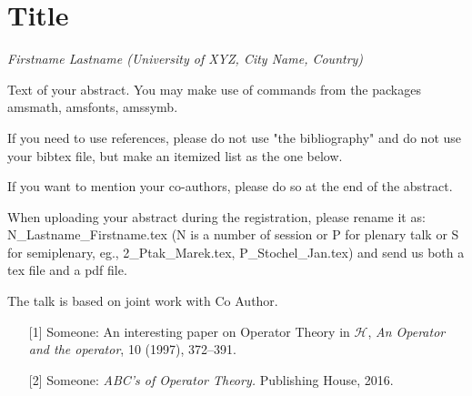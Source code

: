 \documentclass{article}
\begin{document}
\newcommand*{\hh}{\mathcal{H}}
\section*{Title}


 {\sl Firstname Lastname (University of XYZ, City Name, Country)}

\medskip
 \noindent
 Text of your abstract. You may make use of commands from the packages amsmath,
amsfonts, amssymb.

If you need to use references, please do not use "the bibliography" and do not use
your bibtex file, but make an itemized list as the one below.

If you want to mention your co-authors, please do so at the end of the abstract.

When uploading  your abstract during the registration, please rename it as: N\_Lastname\_Firstname.tex
(N is a number of session or P for plenary talk or S for semiplenary,   eg., 2\_Ptak\_Marek.tex, P\_Stochel\_Jan.tex) and send
us both a tex file and a pdf file.


The talk is based on joint work with Co Author.

\begin{itemize}
 \item[{[1]}] Someone: An interesting paper on Operator Theory in $\hh$, \emph{An Operator
and the operator}, 10 (1997), 372--391.
 \item[{[2]}] Someone: \emph{ABC's of Operator Theory.} Publishing House, 2016.
 \end{itemize}
\end{document}
